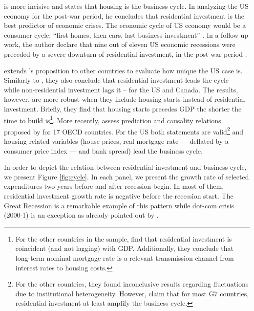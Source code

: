 \documentclass[12pt, a4paper]{article}
\begin{document}
\textcite{leamer_housing_2007} is more incisive and states that housing is the business cycle.
In analyzing the US economy for the post-war period, he concludes that residential investment is the best predictor of economic crises.
The economic cycle of US economy would be a consumer cycle: ``first homes, then cars, last business investment'' \cite[p.~8]{leamer_housing_2007}.
In a follow up work, the author declare that nine out of eleven US economic recessions were preceded by a severe downturn of residential investment, in the post-war period \cite{leamer_housing_2015}.

\textcite{kydland_2016_housing} extends \citeauthor*{leamer_housing_2007}'s \citeyear{leamer_housing_2007} proposition to other countries to evaluate how unique the US case is.
Similarly to \textcite{green_follow_1997}, they also conclude that residential investment leads the cycle -- while non-residential investment lags it -- for the US and Canada.
The results, however, are more robust when they include housing starts instead of residential investment.
Briefly, they find that housing starts precedes GDP the shorter the time to build is\footnote{For the other countries in the sample, \textcite{kydland_2016_housing} find that residential investment is coincident (and not lagging) with GDP. Additionally, they conclude that long-term nominal mortgage rate is a relevant transmission channel from interest rates to housing costs.}.
More recently, \textcite{huang_is_2018} assess  prediction and causality relations proposed by \textcite{leamer_housing_2007} for 17 OECD countries.
For the US both statements are valid\footnote{For the other countries, they found inconclusive results regarding fluctuations due to institutional heterogeneity. However, \textcite{huang_is_2018} claim that for most G7 countries, residential investment at least amplify the business cycle.} and housing related variables (house prices, real mortgage rate --- deflated by a consumer price index --- and bank spread) lead the business cycle.


In order to depict the relation between residential investment and business cycle, we present Figure \ref{fig:cycle}.
In each panel, we present the growth rate of selected expenditures two years before and after recession begin.
In most of them, residential investment growth rate is negative before the recession start.
The Great Recession is a remarkable example of this pattern while dot-com crisis (2000-1) is an exception as already pointed out by \textcite{leamer_housing_2007}.
\end{document}
